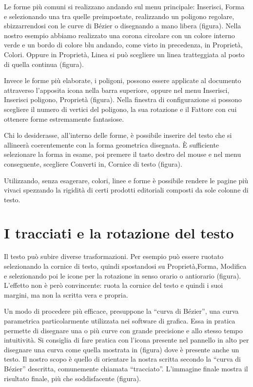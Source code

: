 \documentclass[a4paper, 12pt]{book}
\begin{document}
Le forme più comuni si realizzano andando sul menu principale: Inserisci, Forma e selezionando una tra quelle preimpostate, realizzando un poligono regolare, sbizzarrendosi con le curve di Bézier o disegnando a mano libera (figura). Nella nostro esempio abbiamo realizzato una corona circolare con un colore interno verde e un bordo di colore blu andando, come visto in precedenza, in Proprietà, Colori. Oppure in Proprietà, Linea si può scegliere un linea tratteggiata al posto di quella continua (figura).

Invece le forme più elaborate, i poligoni, possono essere applicate al documento attraverso l'apposita icona nella barra superiore, oppure nel menu Inserisci, Inserisci poligono, Proprietà (figura). Nella finestra di configurazione si possono scegliere il numero di vertici del poligono, la sua rotazione e il Fattore con cui ottenere forme estremamente fantasiose.

Chi lo desiderasse, all'interno delle forme, è possibile inserire del testo che si allineerà coerentemente con la forma geometrica disegnata. È sufficiente selezionare la forma in esame, poi premere il tasto destro del mouse e nel menu conseguente, scegliere Converti in, Cornice di testo (figura).

Utilizzando, senza esagerare, colori, linee e forme è possibile rendere le pagine più vivaci spezzando la rigidità di certi prodotti editoriali composti da sole colonne di testo.

\section{I tracciati e la rotazione del testo}
Il testo può subire diverse trasformazioni. Per esempio può essere ruotato selezionando la cornice di testo, quindi spostandosi su Proprietà,Forma, Modifica e selezionando poi le icone per la rotazione in senso orario o antiorario (figura). L'effetto non è però convincente: ruota la cornice del testo e quindi i suoi margini, ma non la scritta vera e propria.

Un modo di procedere più efficace, presuppone la “curva di Bézier”, una curva parametrica particolarmente utilizzata nei software di grafica. Essa in pratica permette di disegnare una o più curve con grande precisione e allo stesso tempo intuitività. Si consiglia di fare pratica con l'icona presente nel pannello in alto per disegnare una curva come quella mostrata in (figura)  dove è presente anche un testo. Il nostro scopo è quello di orientare la nostra scritta secondo la “curva di Bézier” descritta, comunemente chiamata “tracciato”. L'immagine finale mostra il risultato finale, più che soddisfacente (figura).
\end{document}
